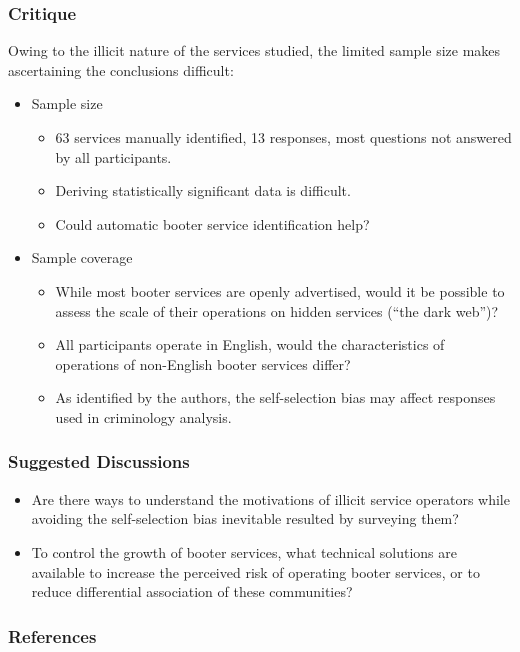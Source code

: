 \documentclass[aspectratio=1610]{beamer}
\begin{document}

\begin{frame}
\frametitle{Critique}
Owing to the illicit nature of the services studied, the limited sample size makes ascertaining the conclusions difficult:
\begin{itemize}
\vspace{1em}
\item Sample size
	\begin{itemize}
	\item 63 services manually identified, 13 responses, most questions not answered by all participants.
	\item Deriving statistically significant data is difficult.
	\item Could automatic booter service identification \cite{santanna2016booter} help?  
	\end{itemize}
\vspace{1em}
\item Sample coverage
	\begin{itemize}
	\item While most booter services are openly advertised, would it be possible to assess the scale of their operations on hidden services (``the dark web'')?
	\item All participants operate in English, would the characteristics of operations of non-English booter services differ?
	\item As identified by the authors, the self-selection bias may affect responses used in criminology analysis.
	\end{itemize}
\end{itemize}

\end{frame}


\begin{frame}
\frametitle{Suggested Discussions}
\begin{itemize}
\setlength\itemsep{1em}
\item Are there ways to understand the motivations of illicit service operators while avoiding the self-selection bias inevitable resulted by surveying them?
\item To control the growth of booter services, what technical solutions are available to increase the perceived risk of operating booter services, or to reduce differential association of these communities?
\end{itemize}
\end{frame}

\begin{frame}[t, allowframebreaks]
\frametitle{References}


\end{frame}
 
\end{document}
